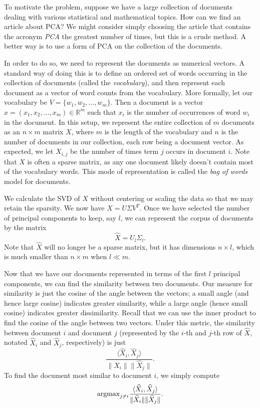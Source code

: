 To motivate the problem, suppose we have a large collection of documents dealing with various statistical and mathematical topics. 
How can we find an article about PCA?
We might consider simply choosing the article that contains the acronym \emph{PCA} the greatest number of times, but this is a crude method.
A better way is to use a form of PCA on the collection of the documents.

In order to do so, we need to represent the documents as numerical vectors.
A standard way of doing this is to define an ordered set of words occurring in the collection of documents (called the \emph{vocabulary}), and then
represent each document as a vector of word counts from the vocabulary.
More formally, let our vocabulary be $V = \{w_1,w_2,\ldots,w_m\}$.
Then a document is a vector $x  = (x_1,x_2,\ldots,x_m) \in \mathbb{R}^m$ such that $x_i$ is the number of occurrences of word $w_i$ in the document.
In this setup, we represent the entire collection of $m$ documents as an $n \times m$ matrix $X$, where $m$ is the length of the vocabulary and $n$ is the number of documents in our collection, each row being a document vector. 
As expected, we let $X_{i,j}$ be the number of times term $j$ occurs in document $i$.
Note that $X$ is often a sparse matrix, as any one document likely doesn't contain most of the vocabulary words.
This mode of representation is called the \emph{bag of words} model for documents.

We calculate the SVD of $X$ without centering or scaling the data so that we may retain the sparsity. 
We now have $X = U\Sigma V^T$. Once we have selected the number of principal components to keep, say $l$, we can represent the corpus of documents by the matrix
\[
\widehat{X} = U_l\Sigma_l.
\]
Note that $\widehat{X}$ will no longer be a sparse matrix, but it has dimensions $n \times l$, which is much smaller than $n \times m$ when $l \ll m$. 

Now that we have our documents represented in terms of the first $l$ principal components, we can find the similarity between two documents. 
Our measure for similarity is just the cosine of the angle between the vectors; a small angle (and hence large cosine) indicates greater similarity, while a large angle (hence small cosine)
indicates greater dissimilarity. 
Recall that we can use the inner product to find the cosine of the angle between two vectors.
Under this metric, the similarity between document $i$ and document $j$ (represented by the $i$-th and $j$-th row of $\widehat{X}$, notated $\widehat{X}_i$ and $\widehat{X}_j$, respectively) is just
\[
\frac{\langle \widehat{X}_i, \widehat{X}_j\rangle}{\|\widehat{X}_i\|\|\widehat{X}_j\|}.
\]
To find the document most similar to document $i$, we simply compute
\[
\mbox{argmax}_{j\neq i} \frac{\langle \widehat{X}_i, \widehat{X}_j\rangle}{\|\widehat{X}_i\|\|\widehat{X}_j\|}.
\]


